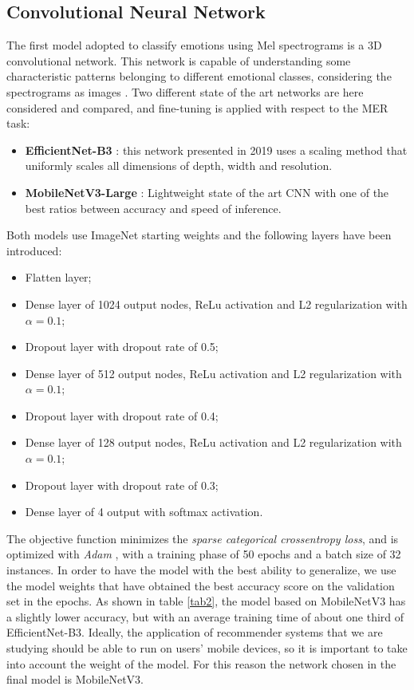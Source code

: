 \documentclass[runningheads]{llncs}
\begin{document}
\subsection{Convolutional Neural Network}
The first model adopted to classify emotions using Mel spectrograms is a 3D convolutional network. This network is capable of understanding some characteristic patterns belonging to different emotional classes, considering the spectrograms as images \cite{bahuleyan2018music}. Two different state of the art networks are here considered and compared, and fine-tuning is applied with respect to the MER task:  %

\begin{itemize}
    \item \textbf{EfficientNet-B3} \cite{tan2019efficientnet}: this network presented in 2019 uses a scaling method that uniformly scales all dimensions of depth, width and resolution.
    \item \textbf{MobileNetV3-Large} \cite{howard2019searching}: Lightweight state of the art CNN with one of the best ratios between accuracy and speed of inference.
\end{itemize}

Both models use ImageNet starting weights and the following layers
have been introduced:
\begin{itemize}
    \item Flatten layer;
    \item Dense layer of 1024 output nodes, ReLu activation and L2 regularization with $\alpha = 0.1$;
    \item Dropout layer with dropout rate of 0.5;
    \item Dense layer of 512 output nodes, ReLu activation and L2 regularization with $\alpha = 0.1$;
    \item Dropout layer with dropout rate of 0.4;
    \item Dense layer of 128 output nodes, ReLu activation and L2 regularization with $\alpha = 0.1$;
    \item Dropout layer with dropout rate of 0.3;
    \item Dense layer of 4 output with softmax activation.
\end{itemize}
The objective function minimizes the \textit{sparse categorical crossentropy loss}, and is optimized with \textit{Adam} \cite{kingma2014adam}, with a training phase of 50 epochs and a batch size of 32 instances. In order to have the model with the best ability to generalize, we use the model weights that have obtained the best accuracy score on the validation set in the epochs. As shown in table \ref{tab2}, the model based on MobileNetV3 has a slightly lower accuracy, but with an average training time of about one third of EfficientNet-B3. Ideally, the application of recommender systems that we are studying should be able to run on users' mobile devices, so it is important to take into account the weight of the model. For this reason the network chosen in the final model is MobileNetV3.
\end{document}
